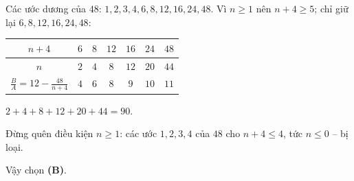 {
Các ước dương của $48$: $1,2,3,4,6,8,12,16,24,48$. Vì $n\ge 1$ nên $n+4\ge 5$; chỉ giữ lại $6,8,12,16,24,48$:
\begin{center}
\begin{tabular}{|c|c|c|c|c|c|c|}
\hline
\rowcolor{tmBlue!10}$n+4$ & $6$ & $8$ & $12$ & $16$ & $24$ & $48$\\ \hline
$n$ & $2$ & $4$ & $8$ & $12$ & $20$ & $44$\\ \hline
$\frac{B}{A}=12-\frac{48}{n+4}$ & $4$ & $6$ & $8$ & $9$ & $10$ & $11$\\ \hline
\end{tabular}
\end{center}

$2+4+8+12+20+44=90$.
\begin{warnbox}Đừng quên điều kiện $n\ge 1$: các ước $1,2,3,4$ của $48$ cho $n+4\le 4$, tức $n\le 0$ -- bị loại.\end{warnbox}
Vậy chọn \textbf{(B)}.
}

